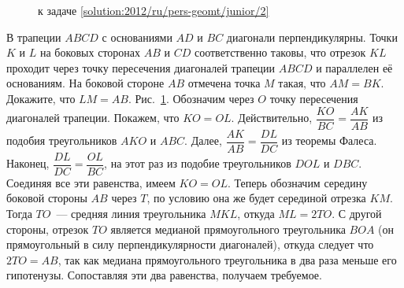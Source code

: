 \ifsolution
\begin{figure}\centering
    \caption{к задаче \ref{solution:2012/ru/pers-geomt/junior/2}}
    \label{fig:solution:2012/ru/pers-geomt/junior/2}
\end{figure}
\fi %

\problem
В трапеции $ABCD$ с основаниями $AD$ и $BC$ диагонали перпендикулярны.
Точки $K$ и $L$ на боковых сторонах $AB$ и $CD$ соответственно таковы, что
отрезок $KL$ проходит через точку пересечения диагоналей трапеции $ABCD$ и
параллелен её основаниям.
На боковой стороне $AB$ отмечена точка $M$ такая, что $AM = BK$.
Докажите, что $LM = AB$.
\solution
\label{solution:2012/ru/pers-geomt/junior/2}%
Рис.~\ref{fig:solution:2012/ru/pers-geomt/junior/2}.
Обозначим через $O$ точку пересечения диагоналей трапеции.
Покажем, что $KO = OL$.
Действительно, $\dfrac{KO}{BC} = \dfrac{AK}{AB}$ из подобия треугольников
$AKO$ и $ABC$.
Далее, $\dfrac{AK}{AB} = \dfrac{DL}{DC}$ из теоремы Фалеса.
Наконец, $\dfrac{DL}{DC} = \dfrac{OL}{BC}$, на этот раз из подобие
треугольников $DOL$ и $DBC$.
Соединяя все эти равенства, имеем $KO = OL$.
Теперь обозначим середину боковой стороны $AB$ через $T$, по условию она же
будет серединой отрезка $KM$.
Тогда $TO$~--- средняя линия треугольника $MKL$, откуда $ML = 2 TO$.
С другой стороны, отрезок $TO$ является медианой прямоугольного треугольника
$BOA$
(он прямоугольный в силу перпендикулярности диагоналей),
откуда следует что $2 TO = AB$, так как медиана прямоугольного треугольника в
два раза меньше его гипотенузы.
Сопоставляя эти два равенства, получаем требуемое.
\endproblem
